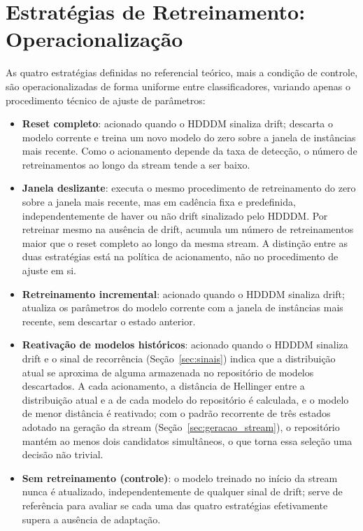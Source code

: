 \section{Estratégias de Retreinamento: Operacionalização}
As quatro estratégias definidas no referencial teórico, mais a condição de
controle, são operacionalizadas de forma uniforme entre classificadores,
variando apenas o procedimento técnico de ajuste de parâmetros:

\begin{itemize}
  \item \textbf{Reset completo}: acionado quando o HDDDM sinaliza drift;
  descarta o modelo corrente e treina um novo modelo do zero sobre a janela
  de instâncias mais recente. Como o acionamento depende da taxa de
  detecção, o número de retreinamentos ao longo da stream tende a ser baixo.
  \item \textbf{Janela deslizante}: executa o mesmo procedimento de
  retreinamento do zero sobre a janela mais recente, mas em cadência fixa e
  predefinida, independentemente de haver ou não drift sinalizado pelo
  HDDDM. Por retreinar mesmo na ausência de drift, acumula um número de
  retreinamentos maior que o reset completo ao longo da mesma stream. A
  distinção entre as duas estratégias está na política de acionamento, não
  no procedimento de ajuste em si.
  \item \textbf{Retreinamento incremental}: acionado quando o HDDDM sinaliza
  drift; atualiza os parâmetros do modelo corrente com a janela de instâncias
  mais recente, sem descartar o estado anterior.
  \item \textbf{Reativação de modelos históricos}: acionado quando o HDDDM
  sinaliza drift e o sinal de recorrência (Seção~\ref{sec:sinais}) indica
  que a distribuição atual se aproxima de alguma armazenada no repositório
  de modelos descartados. A cada acionamento, a distância de Hellinger entre
  a distribuição atual e a de cada modelo do repositório é calculada, e o
  modelo de menor distância é reativado; com o padrão recorrente de três
  estados adotado na geração da stream (Seção~\ref{sec:geracao_stream}), o
  repositório mantém ao menos dois candidatos simultâneos, o que torna essa
  seleção uma decisão não trivial.
  \item \textbf{Sem retreinamento (controle)}: o modelo treinado no início
  da stream nunca é atualizado, independentemente de qualquer sinal de
  drift; serve de referência para avaliar se cada uma das quatro estratégias
  efetivamente supera a ausência de adaptação.
\end{itemize}


